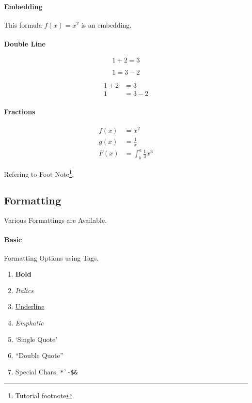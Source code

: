 \documentclass{report}[a4paper,12pt] %
\begin{document}
\paragraph{Embedding}

This formula $f(x) = x^2$ is an embedding.

\paragraph*{Double Line}

\begin{equation*}
  1 + 2 = 3 
\end{equation*}

\begin{equation*}
  1 = 3 - 2
\end{equation*}

\begin{align*}
  1 + 2 &= 3\\
  1 &= 3 - 2
\end{align*}

\paragraph{Fractions}

\begin{align*}
  f(x) &= x^2\\
  g(x) &= \frac{1}{x}\\
  F(x) &= \int^a_b \frac{1}{3}x^3
\end{align*}

Refering to Foot Note\footnote{\label{myfootnote}Tutorial footnote}.

\subsection{Formatting}

Various \hypertarget{sen:formatopts}{Formattings} are Available.
\paragraph{Basic} Formatting Options using Tags.
\begin{enumerate}
  \item \textbf{Bold}
  \item \textit{Italics}
  \item \underline{Underline}
  \item \emph{Emphatic}
  \item `Single Quote'
  \item ``Double Quote''
  \item Special Chars, \verb|*`-$&|
\end{enumerate}
\end{document}
